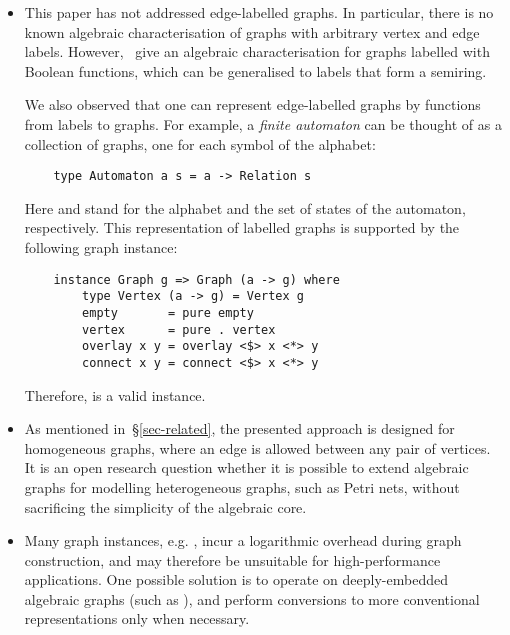 \begin{itemize}
    \item This paper has not addressed edge-labelled graphs. In particular, there is
    no known algebraic characterisation of graphs with arbitrary vertex and edge labels.
    However,~\citet{2014_algebra_mokhov} give an algebraic characterisation for graphs
    labelled with Boolean functions, which can be generalised to labels that form
    a semiring.

    We also observed that one can represent edge-labelled graphs by functions from labels
    to graphs. For example, a \emph{finite automaton} can be thought of as a collection
    of graphs, one for each symbol of the alphabet:

    \vspace{2mm}
    \begin{verbatim}
    type Automaton a s = a -> Relation s
    \end{verbatim}
    \vspace{2mm}

    \noindent
    Here  and  stand for the alphabet and the set of states of the
    automaton, respectively. This representation of labelled graphs is supported
    by the following graph instance:

    \vspace{2mm}
    \begin{verbatim}
    instance Graph g => Graph (a -> g) where
        type Vertex (a -> g) = Vertex g
        empty       = pure empty
        vertex      = pure . vertex
        overlay x y = overlay <$> x <*> y
        connect x y = connect <$> x <*> y
    \end{verbatim}
    \vspace{2mm}

    \noindent
    Therefore,  is a valid  instance.

    \item As mentioned in~\S\ref{sec-related}, the presented approach is designed
    for homogeneous graphs, where an edge is allowed between any pair of vertices.
    It is an open research question whether it is possible to extend algebraic graphs
    for modelling heterogeneous graphs, such as Petri nets, without sacrificing the
    simplicity of the algebraic core.

    \item Many graph instances, e.g. , incur a logarithmic overhead
    during graph construction, and may therefore be unsuitable for
    high-performance applications. One possible solution is to operate on
    deeply-embedded algebraic graphs (such as ), and perform
    conversions to more conventional representations only when necessary.


\end{itemize}
